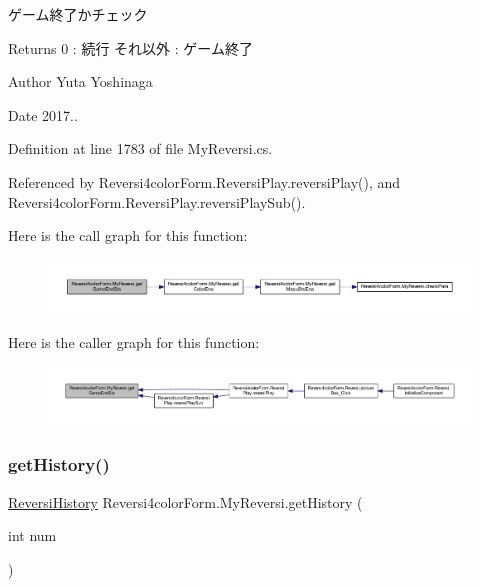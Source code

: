 ゲーム終了かチェック 

\begin{DoxyReturn}{Returns}
0 \+: 続行 それ以外 \+: ゲーム終了 
\end{DoxyReturn}
\begin{DoxyAuthor}{Author}
Yuta Yoshinaga 
\end{DoxyAuthor}
\begin{DoxyDate}{Date}
2017.. 
\end{DoxyDate}


Definition at line 1783 of file My\+Reversi.\+cs.



Referenced by Reversi4color\+Form.\+Reversi\+Play.\+reversi\+Play(), and Reversi4color\+Form.\+Reversi\+Play.\+reversi\+Play\+Sub().

Here is the call graph for this function\+:\nopagebreak
\begin{figure}[H]
\begin{center}
\leavevmode
\includegraphics[width=350pt]{class_reversi4color_form_1_1_my_reversi_a5bdb21a8261d4af70bc2fabe7305ce22_cgraph}
\end{center}
\end{figure}
Here is the caller graph for this function\+:\nopagebreak
\begin{figure}[H]
\begin{center}
\leavevmode
\includegraphics[width=350pt]{class_reversi4color_form_1_1_my_reversi_a5bdb21a8261d4af70bc2fabe7305ce22_icgraph}
\end{center}
\end{figure}
\mbox{\label{class_reversi4color_form_1_1_my_reversi_a6765e90e98f20c7a19a941400446d006}} 
\subsubsection{\texorpdfstring{get\+History()}{getHistory()}}
{\footnotesize\ttfamily \hyperlink{class_reversi4color_form_1_1_reversi_history}{Reversi\+History} Reversi4color\+Form.\+My\+Reversi.\+get\+History (\begin{DoxyParamCaption}\item[{int}]{num }\end{DoxyParamCaption})}



